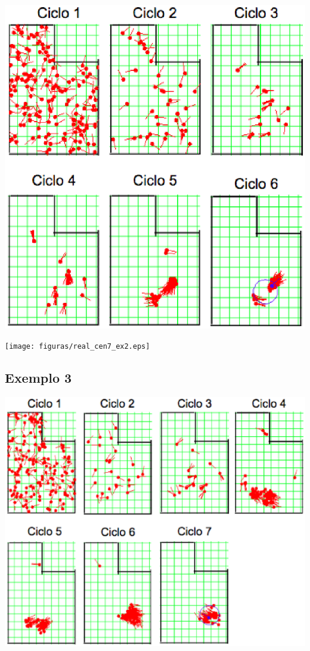 {\centering
\includegraphics[scale=0.4]{figuras/cen7_ex2.eps}
\label{img:cen7_ex2}
\par}

{\centering
\texttt{[image: figuras/real\_cen7\_ex2.eps]}
\label{img:real_cen7_ex2}
\par}

\subsection{Exemplo 3}

{\centering
\includegraphics[scale=0.4]{figuras/cen7_ex3.eps}
\label{img:cen7_ex3}
\par}

